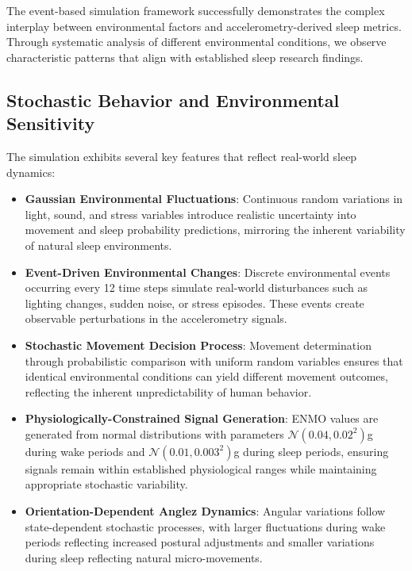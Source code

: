\documentclass[conference]{IEEEtran}
\begin{document}
The event-based simulation framework successfully demonstrates the complex interplay between environmental factors and accelerometry-derived sleep metrics. Through systematic analysis of different environmental conditions, we observe characteristic patterns that align with established sleep research findings.

\subsection{Stochastic Behavior and Environmental Sensitivity}

The simulation exhibits several key features that reflect real-world sleep dynamics:

\begin{itemize}
	\item \textbf{Gaussian Environmental Fluctuations}: Continuous random variations in light, sound, and stress variables introduce realistic uncertainty into movement and sleep probability predictions, mirroring the inherent variability of natural sleep environments.

	\item \textbf{Event-Driven Environmental Changes}: Discrete environmental events occurring every 12 time steps simulate real-world disturbances such as lighting changes, sudden noise, or stress episodes. These events create observable perturbations in the accelerometry signals.

	\item \textbf{Stochastic Movement Decision Process}: Movement determination through probabilistic comparison with uniform random variables ensures that identical environmental conditions can yield different movement outcomes, reflecting the inherent unpredictability of human behavior.

	\item \textbf{Physiologically-Constrained Signal Generation}: ENMO values are generated from normal distributions with parameters $\mathcal{N}(0.04, 0.02^2)$g during wake periods and $\mathcal{N}(0.01, 0.003^2)$g during sleep periods, ensuring signals remain within established physiological ranges while maintaining appropriate stochastic variability.

	\item \textbf{Orientation-Dependent Anglez Dynamics}: Angular variations follow state-dependent stochastic processes, with larger fluctuations during wake periods reflecting increased postural adjustments and smaller variations during sleep reflecting natural micro-movements.
\end{itemize}
\end{document}
